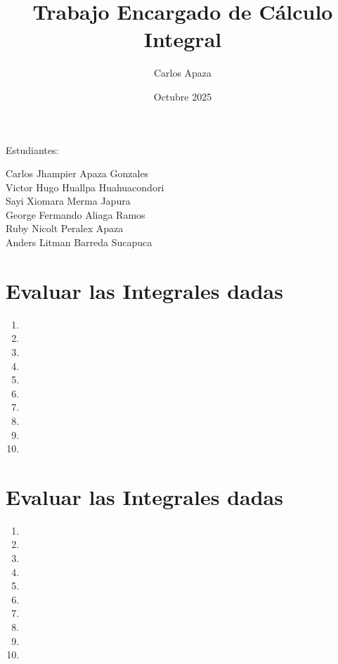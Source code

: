 \documentclass[11pt]{article}
\title{Trabajo Encargado de Cálculo Integral}
\author{Carlos Apaza}
\date{Octubre 2025}
\begin{document}
\begin{titlepage}
    \centering
    {\Huge\bfseries \thetitle\par}
    \vspace{1cm}
    {\Large Estudiantes:\par}
    {\large Carlos Jhampier Apaza Gonzales\\
    Victor Hugo Huallpa Huahuacondori\\
    Sayi Xiomara Merma Japura\\
    George Fermando Aliaga Ramos\\
    Ruby Nicolt Peralex Apaza\\
    Anders Litman Barreda Sucapuca\\\par}
    \vfill
    {\large \thedate\par}
\end{titlepage}

\section{Evaluar las Integrales dadas}
\begin{enumerate}[label=\textbf{\arabic*.}]
    \item 
    \item 
    \item 
    \item 
    \newpage
    \item 
    \item 
    \item 
    \item 
    \item 
    \item 
\end{enumerate}
\section{Evaluar las Integrales dadas}
\begin{enumerate}[resume,label=\textbf{\arabic*.}]
    \item 
    \item 
    \item 
    \item 
    \item 
    \item 
    \item 
    \item 
    \item 
    \item 
\end{enumerate}
\end{document}
